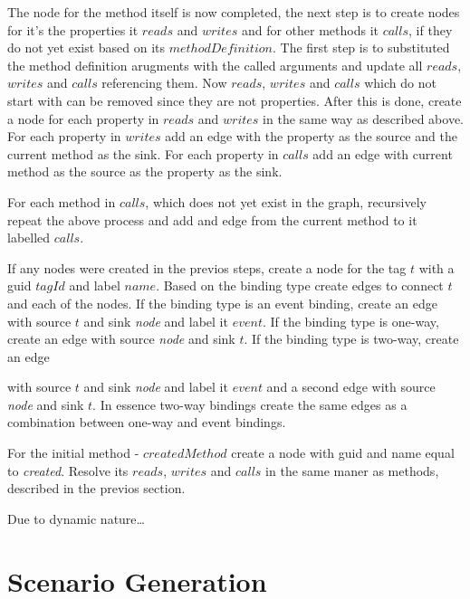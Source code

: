 The node for the method itself is now completed, the next step is to create nodes for it's the properties it $reads$ and $writes$ and for other methods it $calls$, if they do not yet exist based on its $methodDefinition$. The first step is to substituted the method definition arugments with the called arguments and update all $reads$, $writes$ and $calls$ referencing them. Now $reads$, $writes$ and $calls$ which do not start with  can be removed since they are not properties. After this is done, create a node for each property in $reads$ and $writes$ in the same way as described above. 
For each property in $writes$ add an edge with the property as the source and the current method as the sink. For each property in $calls$ add an edge with current method as the source as the property as the sink.

For each method in $calls$, which does not yet exist in the graph, recursively repeat the above process and add and edge from the current method to it labelled $calls$. 


If any nodes were created in the previos steps, create a node for the tag $t$ with a \gls{guid} $tagId$ and label $name$. Based on the binding type create edges to connect $t$ and each of the nodes.
If the binding type is an event binding, create an 
edge with source $t$ and sink \textit{node} and label it $event$. 
If the binding type is one-way, create an edge with source \textit{node} and sink $t$.
If the binding type is two-way, create an edge

with source $t$ and sink \textit{node} and label it $event$ and a second edge with source \textit{node} and sink $t$. In essence two-way bindings create the same edges as a combination between one-way and event bindings.

For the initial method - $createdMethod$ create a node with \gls{guid} and name equal to \textit{created}. Resolve its $reads$, $writes$ and $calls$ in the same maner as methods, described in the previos section.



Due to dynamic nature\dots
\section{Scenario Generation}

